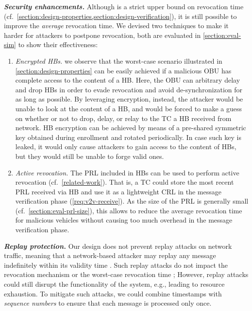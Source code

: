 \noindent\textbf{\emph{Security enhancements.}}
%
Although \paramteff{} is a strict upper bound on revocation time
(cf.~\cref{section:design-properties,section:design-verification}), it is still
possible to improve the \emph{average} revocation time. We devised two
techniques to make it harder for attackers to postpone revocation, both are evaluated in \cref{section:eval-sim} to show their effectiveness:
%
\begin{enumerate}
    \item \emph{Encrypted \acp{HB}.} we observe that the worst-case scenario
    illustrated in \cref{section:design-properties} can be easily achieved if a
    malicious \ac{OBU} has complete access to the content of a \ac{HB}. Here,
    the \ac{OBU} can arbitrary delay and drop \acp{HB} in order to evade
    revocation and avoid de-synchronization for as long as possible. By
    leveraging encryption, instead, the attacker would be unable to look at the
    content of a \ac{HB}, and would be forced to make a guess on whether or not
    to drop, delay, or relay to the \ac{TC} a \ac{HB} received from network.
    \ac{HB} encryption can be achieved by means of a pre-shared symmetric key
    obtained during enrollment and rotated periodically. In case such key is
    leaked, it would only cause attackers to gain access to the content of
    \acp{HB}, but they would still be unable to forge valid ones.
    \item \emph{Active revocation.} The \ac{PRL} included in \acp{HB} can be
    used to perform active revocation (cf.~\cref{related-work}). That is, a
    \ac{TC} could store the most recent \ac{PRL} received via \ac{HB} and use it
    as a lightweight \ac{CRL} in the message verification phase
    (\cref{req:v2v-receive}). As the size of the \ac{PRL} is generally small
    (cf.~\cref{section:eval-prl-size}), this allows to reduce the average
    revocation time for malicious vehicles without causing too much overhead in
    the message verification phase.
\end{enumerate}
%

\iffalse
\noindent\textbf{\emph{Replay protection.}}
%
Our design does not prevent replay attacks on network traffic, meaning that a
network-based attacker may replay any message indefinitely within its validity
time \paramtt{}. Such replay attacks do not impact the revocation mechanism or
the worst-case revocation time \paramteff; However, replay attacks could still
disrupt the functionality of the system, e.g., leading to resource exhaustion.
To mitigate such attacks, we could combine timestamps with \emph{sequence
numbers} to ensure that each message is processed only once.

